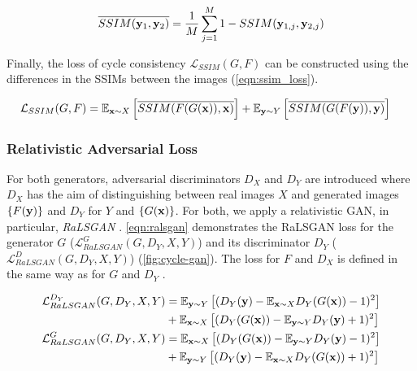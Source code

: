 \begin{equation}
   \label{eqn:ssim_difference}
   \begin{aligned}
      \overline{SSIM(\mathbf{y}_1,\mathbf{y}_2)} = \frac{1}{M}\sum_{j=1}^{M}1 - SSIM(\mathbf{y}_{1,j},\mathbf{y}_{2,j})
   \end{aligned}
\end{equation}

Finally, the loss of cycle consistency $\mathcal{L}_{SSIM}(G, F)$ can be constructed using the differences in the SSIMs between the images (\autoref{eqn:ssim_loss}).

\begin{equation}
   \label{eqn:ssim_loss}
   \begin{aligned}
      \mathcal{L}_{SSIM}(G,F) & = \mathbb{E}_{\mathbf{x} \sim X}\left[\overline{SSIM(F(G(\mathbf{x})), \mathbf{x})}\right] + \mathbb{E}_{\mathbf{y} \sim Y}\left[\overline{SSIM(G(F(\mathbf{y})), \mathbf{y})}\right]
   \end{aligned}
\end{equation}


\subsubsection*{Relativistic Adversarial Loss}
For both generators, adversarial discriminators $D_X$ and $D_Y$ are introduced where $D_X$ has the aim of distinguishing between real images
$X$ and generated images $\{F(\mathbf{y})\}$ and $D_Y$ for $Y$ and $\{G(\mathbf{x})\}$.
For both, we apply a relativistic GAN, in particular, \textit{RaLSGAN} \parencite{mehri,rel_gan}.
\autoref{eqn:ralsgan} demonstrates the RaLSGAN loss for the generator $G$ ($\mathcal{L}^G_{RaLSGAN}(G,D_Y,X,Y)$) and its discriminator
$D_Y$ ($\mathcal{L}^D_{RaLSGAN}(G,D_Y,X,Y)$) (\autoref{fig:cycle-gan}). The loss for $F$ and $D_X$ is defined in the same way as for $G$ and $D_Y$ \parencite{rel_gan}.

\begin{equation}
   \label{eqn:ralsgan}
   \begin{aligned}
      \mathcal{L}^{D_Y}_{RaLSGAN}(G,D_Y,X,Y) & = \mathbb{E}_{\mathbf{y} \sim Y}\left[(D_Y(\mathbf{y}) - \mathbb{E}_{\mathbf{x} \sim X} D_Y(G(\mathbf{x})) - 1)^2 \right] \\
                                             & + \mathbb{E}_{\mathbf{x} \sim X}\left[(D_Y(G(\mathbf{x})) - \mathbb{E}_{\mathbf{y} \sim Y} D_Y(\mathbf{y}) + 1)^2 \right] \\
      \mathcal{L}^G_{RaLSGAN}(G,D_Y,X,Y)     & = \mathbb{E}_{\mathbf{x} \sim X}\left[(D_Y(G(\mathbf{x})) - \mathbb{E}_{\mathbf{y} \sim Y} D_Y(\mathbf{y}) - 1)^2 \right] \\
                                             & + \mathbb{E}_{\mathbf{y} \sim Y}\left[(D_Y(\mathbf{y}) - \mathbb{E}_{\mathbf{x} \sim X} D_Y(G(\mathbf{x})) + 1)^2 \right]
   \end{aligned}
\end{equation}

